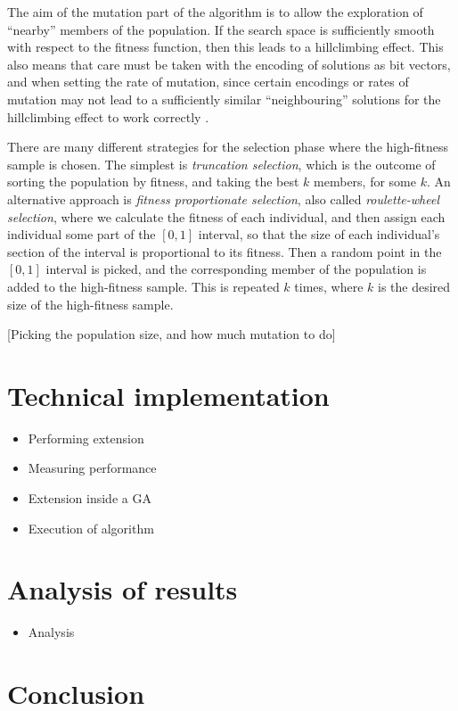 \documentclass[11pt]{article}
\begin{document}
The aim of the mutation part of the algorithm is to allow the exploration of ``nearby'' members of the population. If the search space is sufficiently smooth with respect to the fitness function, then this leads to a hillclimbing effect. This also means that care must be taken with the encoding of solutions as bit vectors, and when setting the rate of mutation, since certain encodings or rates of mutation may not lead to a sufficiently similar ``neighbouring'' solutions for the hillclimbing effect to work correctly \cite{Taher:2013}.

There are many different strategies for the selection phase where the high-fitness sample is chosen. The simplest is \emph{truncation selection}, which is the outcome of sorting the population by fitness, and taking the best $k$ members, for some $k$. An alternative approach is \emph{fitness proportionate selection}, also called \emph{roulette-wheel selection}, where we calculate the fitness of each individual, and then assign each individual some part of the $[0,1]$ interval, so that the size of each individual's section of the interval is proportional to its fitness. Then a random point in the $[0,1]$ interval is picked, and the corresponding member of the population is added to the high-fitness sample. This is repeated $k$ times, where $k$ is the desired size of the high-fitness sample.

[Picking the population size, and how much mutation to do]



\section{Technical implementation}

\begin{itemize}
  \item Performing extension
  \item Measuring performance
  \item Extension inside a GA
  \item Execution of algorithm
\end{itemize}

\section{Analysis of results}

\begin{itemize}
  \item Analysis
\end{itemize}

\section{Conclusion}



\end{document}

